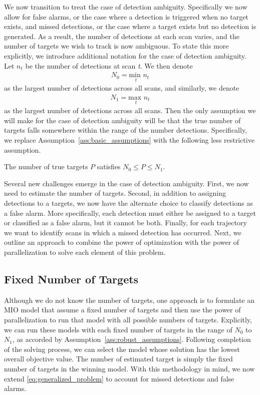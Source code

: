 We now transition to treat the case of detection ambiguity. Specifically we now allow for false alarms, or the case where a detection is triggered when no target exists, and missed detections, or the case where a target exists but no detection is generated. As a result, the number of detections at each scan varies, and the number of targets we wish to track is now ambiguous. To state this more explicitly, we introduce additional notation for the case of detection ambiguity. Let $n_{t}$ be the number of detections at scan \textit{t}. We then denote 
\begin{align}
N_{0} = \underset{t}{\text{min }} n_{t}
\end{align}
as the largest number of detections across all scans, and similarly, we denote
\begin{align}
N_{1} = \underset{t}{\text{max }}  n_{t}
\end{align}
as the largest number of detections across all scans. Then the only assumption we will make for the case of detection ambiguity will be that the true number of targets falls somewhere within the range of the number detections. Specifically, we replace Assumption~\ref{ass:basic_assumptions} with the following less restrictive assumption.
\begin{assumption}\label{ass:robust_assumptions}
\item The number of true targets $P$ satisfies $N_0\leq P \leq N_1$.
\end{assumption}

Several new challenges emerge in the case of detection ambiguity. First, we now need to estimate the number of targets. Second, in addition to assigning detections to a targets, we now have the alternate choice to classify detections as a false alarm. More specifically, each detection must either be assigned to a target or classified as a false alarm, but it cannot be both. Finally, for each trajectory we want to identify scans in which a missed detection has occurred. Next, we outline an approach to combine the power of optimization with the power of parallelization to solve each element of this problem.
 
\subsection{Fixed Number of Targets}
Although we do not know the number of targets, one approach is to formulate an MIO model that assume a fixed number of targets and then use the power of parallelization to run that model with all possible numbers of targets. Explicitly, we can run these models with each fixed number of targets in the range of $N_{0}$ to $N_{1}$, as accorded by Assumption~\ref{ass:robust_assumptions}. Following completion of the solving process, we can select the model whose solution has the lowest overall objective value. The number of estimated target is simply the fixed number of targets in the winning model. With this methodology in mind, we now extend \eqref{eq:generalized_problem} to account for missed detections and false alarms. 

